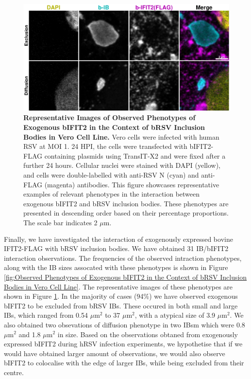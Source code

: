 \begin{figure}
    \centering
    \includegraphics[width=1\linewidth]{09. Chapter 4/Figs/02. Overexpression/02. IFIT2/09. bi2f-brsv.pdf}
    \caption[Representative Images of Observed Phenotypes of Exogenous bIFIT2 in the Context of bRSV Inclusion Bodies in Vero Cell Line.]{\textbf{Representative Images of Observed Phenotypes of Exogenous bIFIT2 in the Context of bRSV Inclusion Bodies in Vero Cell Line.} Vero cells were infected with human RSV at MOI 1. 24 HPI, the cells were transfected with bIFIT2-FLAG containing plasmids using TransIT-X2 and were fixed after a further 24 hours. Cellular nuclei were stained with DAPI (yellow), and cells were double-labelled with anti-RSV N (cyan) and anti-FLAG (magenta) antibodies. This figure showcases representative examples of relevant phenotypes in the interaction between exogenous bIFIT2 and bRSV inclusion bodies. These phenotypes are presented in descending order based on their percentage proportions. The scale bar indicates 2 \(\mu \mbox{m}\).}
    \label{fig:Representative Images of Observed Phenotypes of Exogenous bIFIT2 in the Context of bRSV Inclusion Bodies in Vero Cell Line}
\end{figure}

Finally, we have investigated the interaction of exogenously expressed bovine IFIT2-FLAG with bRSV inclusion bodies. We have obtained 31 IB/bIFIT2 interaction observations. The frequencies of the observed intraction phenotypes, along with the IB sizes assocated with these phenotypes is shown in Figure \ref{fig:Observed Phenotypes of Exogenous bIFIT2 in the Context of bRSV Inclusion Bodies in Vero Cell Line}. The representative images of these phenotypes are shown in Figure \ref{fig:Representative Images of Observed Phenotypes of Exogenous bIFIT2 in the Context of bRSV Inclusion Bodies in Vero Cell Line}. In the majority of cases (94\%) we have observed exogenous bIFIT2 to be excluded from bRSV IBs. These occured in both small and large IBs, which ranged from 0.54 \(\mu \mbox{m}^2\) to 37 \(\mu \mbox{m}^2\), with a atypical size of 3.9 \(\mu \mbox{m}^2\). We also obtained two obsevations of diffusion phenotype in two IBsm which were 0.8 \(\mu \mbox{m}^2\) and 1.8 \(\mu \mbox{m}^2\) in size. Based on the observations obtaned from exogenously expressed bIFIT2 during hRSV infection experiments, we hypothetise that if we would have obtained larger amount of observations, we would also observe bIFIT2 to colocalise with the edge of larger IBs, while being excluded from their centre.

